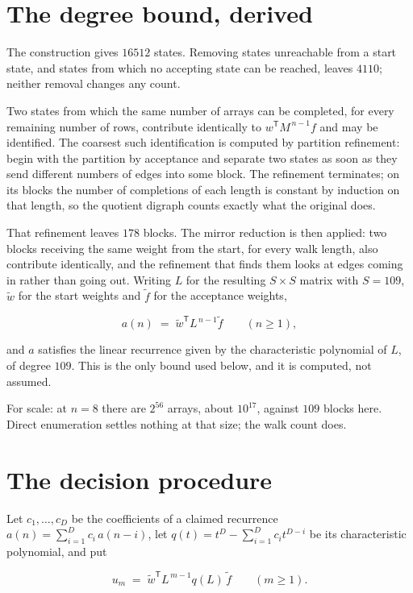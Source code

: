 \documentclass[11pt]{article}
\theoremstyle{definition}
\begin{document}
\section{The degree bound, derived}

The construction gives $16512$ states. Removing states unreachable from a start state, and states from which no accepting state can be reached, leaves $4110$; neither removal changes any count.

Two states from which the same number of arrays can be completed, for every remaining number of rows, contribute identically to $w^{\mathsf T}M^{\,n-1}f$ and may be identified. The coarsest such identification is computed by partition refinement: begin with the partition by acceptance and separate two states as soon as they send different numbers of edges into some block. The refinement terminates; on its blocks the number of completions of each length is constant by induction on that length, so the quotient digraph counts exactly what the original does.

That refinement leaves $178$ blocks. The mirror reduction is then applied: two blocks receiving the same weight from the start, for every walk length, also contribute identically, and the refinement that finds them looks at edges coming in rather than going out. Writing $L$ for the resulting $S \times S$ matrix with $S = 109$, $\tilde w$ for the start weights and $\tilde f$ for the acceptance weights,

\[a(n) \;=\; \tilde w^{\mathsf T} L^{\,n-1} \tilde f \qquad (n \ge 1),\]

and $a$ satisfies the linear recurrence given by the characteristic polynomial of $L$, of degree $109$. This is the only bound used below, and it is computed, not assumed.

For scale: at $n = 8$ there are $2^{56}$ arrays, about $10^{17}$, against $109$ blocks here. Direct enumeration settles nothing at that size; the walk count does.

\section{The decision procedure}

Let $c_1,\dots,c_D$ be the coefficients of a claimed recurrence $a(n) = \sum_{i=1}^{D} c_i\,a(n-i)$, let $q(t) = t^{D} - \sum_{i=1}^{D} c_i t^{D-i}$ be its characteristic polynomial, and put

\[u_m \;=\; \tilde w^{\mathsf T} L^{\,m-1} q(L)\,\tilde f \qquad (m \ge 1).\]
\end{document}
